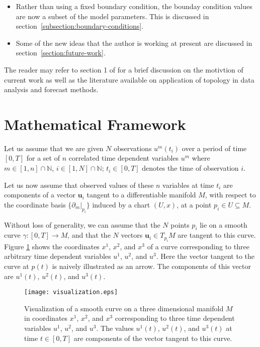 \documentclass{article}
\begin{document}
\begin{itemize}
    \item Rather than using a fixed boundary condition, the bounday
      condition values are now a subset of the model parameters. This
      is discussed in section~\ref{subsection:boundary-conditions}.
    \item Some of the new ideas that the author is working at present
      are discussed in section~\ref{section:future-work}.
\end{itemize}

The reader may refer to section 1 of \cite{emami-geo-2021} for a brief
discussion on the motivtion of current work as well as the literature
available on application of topology in data analysis and forecast
methods.

\section{Mathematical Framework}
\label{section:framework}

Let us assume that we are given $N$ observations $u^{m}(t_{i})$ over a
period of time $[0,T]$ for a set of $n$ correlated time dependent
variables $u^{m}$ where $m \in [1,n] \cap \mathbb{N}$, $i \in [1,N]
\cap \mathbb{N}$; $t_{i} \in [0,T]$ denotes the time of observation
$i$.

Let us now assume that observed values of these $n$ variables at time
$t_{i}$ are components of a vector $\mathbf{u}_{i}$ tangent to a
differentiable manifold $M$, with respect to the coordinate basis
$\{\partial_{m}|_{p_{i}}\}$ induced by a chart $(U, x)$, at a point
$p_{i} \in U \subseteq M$.

Without loss of generality, we can assume that the $N$ points $p_{i}$
lie on a smooth curve $\gamma:[0,T] \to M$, and that the $N$ vectors
$\mathbf{u}_{i} \in T_{p_{i}}M$ are tangent to this curve. Figure
\ref{fig:visualization} shows the coordinates $x^{1}$, $x^{2}$, and
$x^{3}$ of a curve corresponding to three arbitrary time dependent
variables $u^{1}$, $u^{2}$, and $u^{3}$. Here the vector tangent to
the curve at $p(t)$ is naively illustrated as an arrow. The components
of this vector are $u^{1}(t)$, $u^{2}(t)$, and $u^{3}(t)$.

\begin{figure}[h]
  \centering
  \texttt{[image: visualization.eps]}
  \caption{Visualization of a smooth curve on a three dimensional
    manifold $M$ in coordinates $x^{1}$, $x^{2}$, and $x^{3}$
    corresponding to three time dependent variables $u^{1}$, $u^{2}$,
    and $u^{3}$. The values $u^{1}(t)$, $u^{2}(t)$, and $u^{3}(t)$ at
    time $t \in [0,T]$ are components of the vector tangent to this
    curve.}
  \label{fig:visualization}
\end{figure}
\end{document}
